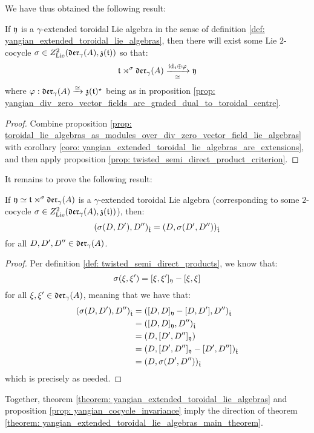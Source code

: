         We have thus obtained the following result:
        \begin{theorem} \label{theorem: yangian_extended_toroidal_lie_algebras}
            If $\mathfrak{y}$ is a $\gamma$-extended toroidal Lie algebra in the sense of definition \ref{def: yangian_extended_toroidal_lie_algebras}, then there will exist some Lie $2$-cocycle $\sigma \in Z^2_{\mathrm{Lie}}(\mathfrak{der}_{\gamma}(A), \mathfrak{z}(\mathfrak{t}))$ so that:
                $$\mathfrak{t} \rtimes^{\sigma} \mathfrak{der}_{\gamma}(A) \xrightarrow[\simeq]{\mathrm{id}_{\mathfrak{t}} \oplus \varphi} \mathfrak{y}$$
            where $\varphi: \mathfrak{der}_{\gamma}(A) \xrightarrow[]{\simeq} \mathfrak{z}(\mathfrak{t})^{\star}$ being as in proposition \ref{prop: yangian_div_zero_vector_fields_are_graded_dual_to_toroidal_centre}.
        \end{theorem}
            \begin{proof}
                Combine proposition \ref{prop: toroidal_lie_algebras_as_modules_over_div_zero_vector_field_lie_algebras} with corollary \ref{coro: yangian_extended_toroidal_lie_algebras_are_extensions}, and then apply proposition \ref{prop: twisted_semi_direct_product_criterion}.
            \end{proof}

        It remains to prove the following result:
        \begin{proposition} \label{prop: yangian_cocycle_invariance}
            If $\mathfrak{y} \simeq \mathfrak{t} \rtimes^{\sigma} \mathfrak{der}_{\gamma}(A)$ is a $\gamma$-extended toroidal Lie algebra (corresponding to some $2$-cocycle $\sigma \in Z^2_{\mathrm{Lie}}(\mathfrak{der}_{\gamma}(A), \mathfrak{z}(\mathfrak{t}))$), then:
                $$(\sigma(D, D'), D'')_{\hat{\mathfrak{t}}} = (D, \sigma(D', D''))_{\hat{\mathfrak{t}}}$$
            for all $D, D', D'' \in \mathfrak{der}_{\gamma}(A)$.
        \end{proposition}
            \begin{proof}
                Per definition \ref{def: twisted_semi_direct_products}, we know that:
                    $$\sigma(\xi, \xi') = [\xi, \xi']_{\mathfrak{y}} - [\xi, \xi]$$
                for all $\xi, \xi' \in \mathfrak{der}_{\gamma}(A)$, meaning that we have that:
                    $$
                        \begin{aligned}
                            (\sigma(D, D'), D'')_{\hat{\mathfrak{t}}} & = ([D, D]_{\mathfrak{y}} - [D, D'], D'')_{\hat{\mathfrak{t}}}
                            \\
                            & = ([D, D]_{\mathfrak{y}}, D'')_{\hat{\mathfrak{t}}} 
                            \\
                            & = (D, [D', D'']_{\mathfrak{y}})
                            \\
                            & = (D, [D', D'']_{\mathfrak{y}} - [D', D''])_{\hat{\mathfrak{t}}}
                            \\
                            & = (D, \sigma(D', D''))_{\hat{\mathfrak{t}}}
                        \end{aligned}
                    $$
                which is precisely as needed.
            \end{proof}

        Together, theorem \ref{theorem: yangian_extended_toroidal_lie_algebras} and proposition \ref{prop: yangian_cocycle_invariance} imply the  direction of theorem \ref{theorem: yangian_extended_toroidal_lie_algebras_main_theorem}.